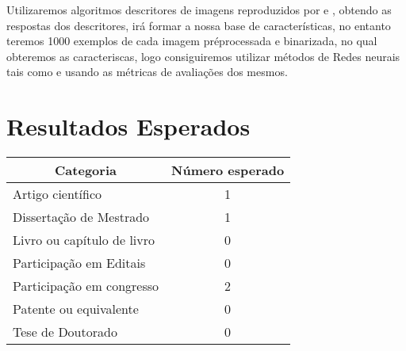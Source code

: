 \documentclass[12pt,a4paper,oneside]{book}
\newcommand\wb[1]{\discretionary{#1}{#1}{#1}}
\begin{document}
Utilizaremos algoritmos descritores de imagens reproduzidos por
\autocite{SAWANT2016} e \autocite{NEWELL2011}, obtendo as respostas dos descritores,
ir\'{a} formar a nossa base de caracter\'{i}sticas, no entanto teremos 1000
exemplos de cada imagem pr\'{e}\wb-processada e binarizada, no qual obteremos as
caracteriscas, logo consiguiremos utilizar m\'{e}todos de Redes neurais tais
como \autocite{KATKAR2015} e usando as m\'{e}tricas de avalia\c{c}\~{o}es dos
mesmos.
\pagebreak
\chapter{Resultados Esperados}
\begin{center}
    \begin{tabular}{|l|c|}
        \hline
        \multicolumn{1}{|c|}{Categoria} & \multicolumn{1}{|c|}{N\'{u}mero
        esperado} \\ \hline
        Artigo cient\'{i}fico & 1 \\ \hline
        Disserta\c{c}\~{a}o de Mestrado & 1 \\ \hline
        Livro ou cap\'{i}tulo de livro & 0 \\ \hline
        Participa\c{c}\~{a}o em Editais & 0 \\ \hline
        Participa\c{c}\~{a}o em congresso & 2 \\ \hline
        Patente ou equivalente & 0 \\ \hline
        Tese de Doutorado & 0 \\ \hline
    \end{tabular}
\end{center}
\pagebreak
\end{document}
